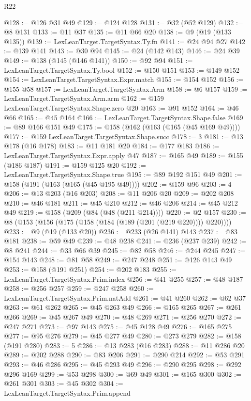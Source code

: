 \begin{lexlean}{R22}
\begin{coremodule}
@128 := @126 @31 @49
@129 := @124 @128
@131 := @32 (@52 @129)
@132 := @8 @131
@133 := @11 @37
@135 := @11 @66 @20
@138 := @9 (@19 (@133 @135))
@139 := LexLeanTarget.TargetSyntax.Ty.fn
@141 := @24 @94 @27
@142 := @139 @141
@143 := @30 @94
@145 := @24 (@142 @143)
@146 := @24 @39
@149 := @138 (@145 (@146 @141))
@150 := @92 @94
@151 := LexLeanTarget.TargetSyntax.Ty.bool
@152 := @150 @151
@153 := @149 @152
@154 := LexLeanTarget.TargetSyntax.Expr.match
@155 := @154 @152
@156 := @155 @58
@157 := LexLeanTarget.TargetSyntax.Arm
@158 := @6 @157
@159 := LexLeanTarget.TargetSyntax.Arm.arm
@162 := @159 LexLeanTarget.TargetSyntax.Shape.zero @20
@163 := @91 @152
@164 := @46 @66
@165 := @45 @164
@166 := LexLeanTarget.TargetSyntax.Shape.false
@169 := @89 @166 @151 @49
@175 := @158 (@162 (@163 (@165 (@45 @169 @49))))
@177 := @159 LexLeanTarget.TargetSyntax.Shape.succ
@178 := 3
@181 := @13 @178 (@16 @178)
@183 := @11 @181 @20
@184 := @177 @183
@186 := LexLeanTarget.TargetSyntax.Expr.apply @47
@187 := @165 @49
@189 := @155 (@186 @187)
@191 := @159 @125 @20
@192 := LexLeanTarget.TargetSyntax.Shape.true
@195 := @89 @192 @151 @49
@201 := @158 (@191 (@163 (@165 (@45 @195 @49))))
@202 := @159 @96
@203 := 4
@206 := @13 @203 (@16 @203)
@208 := @11 @206 @20
@209 := @202 @208
@210 := @46 @181
@211 := @45 @210
@212 := @46 @206
@214 := @45 @212 @49
@219 := @158 (@209 (@84 (@48 (@211 @214))))
@220 := @2 @157
@230 := @8 (@153 (@156 (@175 (@158 (@184 (@189 (@201 (@219 @220)))) @220))))
@233 := @9 (@19 (@133 @20))
@236 := @233 (@26 @141) @143
@237 := @83 @181
@238 := @59 @49
@239 := @48 @238
@241 := @236 (@237 @239)
@242 := @8 @241
@244 := @33 @66 @39
@245 := @82 @58
@246 := @244 @245
@247 := @154 @143
@248 := @81 @58
@249 := @247 @248
@251 := @126 @143 @49
@253 := @158 (@191 @251)
@254 := @202 @183
@255 := LexLeanTarget.TargetSyntax.Prim.index
@256 := @41 @255
@257 := @48 @187
@258 := @256 @257
@259 := @247 @258
@260 := LexLeanTarget.TargetSyntax.Prim.natAdd
@261 := @41 @260
@262 := @62 @37
@263 := @61 @262
@265 := @45 @263 @49
@266 := @165 @265
@267 := @261 @266
@269 := @45 @267 @49
@270 := @48 @269
@271 := @256 @270
@272 := @247 @271
@273 := @97 @143
@275 := @45 @128 @49
@276 := @165 @275
@277 := @95 @276
@279 := @45 @277 @49
@280 := @273 @279
@282 := @158 (@191 @280)
@283 := 5
@286 := @13 @283 (@16 @283)
@288 := @11 @286 @20
@289 := @202 @288
@290 := @83 @206
@291 := @290 @214
@292 := @53 @291
@293 := @46 @286
@295 := @45 @293 @49
@296 := @290 @295
@298 := @292 @296 @169
@299 := @53 @298
@300 := @69 @49
@301 := @165 @300
@302 := @261 @301
@303 := @45 @302
@304 := LexLeanTarget.TargetSyntax.Prim.append

\end{coremodule}
\end{lexlean}
